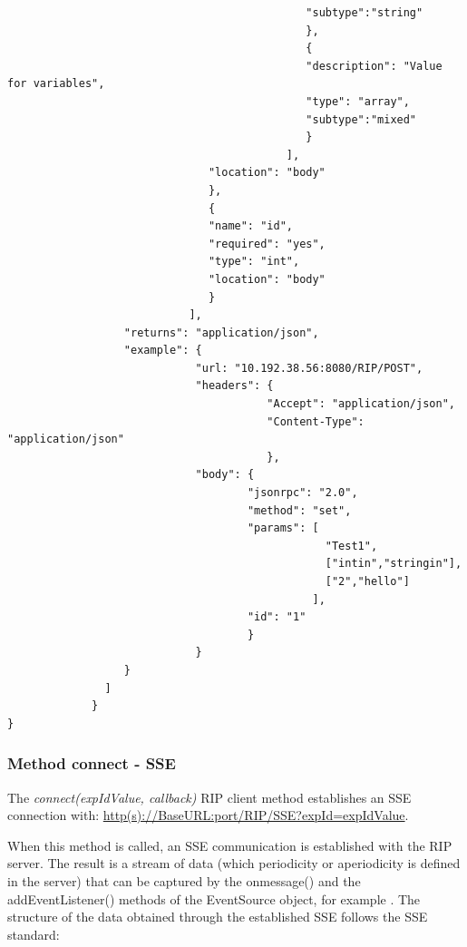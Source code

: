 \begin{lstlisting}
                                              "subtype":"string"
                                              },
                                              {
                                              "description": "Value for variables",
                                              "type": "array",
                                              "subtype":"mixed"
                                              }
                                           ],
                               "location": "body"
                               },
                               {
                               "name": "id",
                               "required": "yes",
                               "type": "int",
                               "location": "body"
                               }
                            ],
                  "returns": "application/json",
                  "example": {
                             "url: "10.192.38.56:8080/RIP/POST",
                             "headers": {
                                        "Accept": "application/json",
                                        "Content-Type": "application/json"
                                        },
                             "body": {
                                     "jsonrpc": "2.0",
                                     "method": "set",
                                     "params": [
                                                 "Test1",
                                                 ["intin","stringin"],
                                                 ["2","hello"]
                                               ],
                                     "id": "1"
                                     }
                             }
                  }
               ]
             }
}
\end{lstlisting}

\subsubsection{Method connect - SSE}
\label{sec:connect}
The \textit{connect(expIdValue, callback)} RIP client method establishes an SSE connection with: \url{http(s)://BaseURL:port/RIP/SSE?expId=expIdValue}.

When this method is called, an SSE communication is established with the RIP server. The result is a stream of data (which periodicity or aperiodicity is defined in the server) that can be captured by the onmessage() and the addEventListener() methods of the EventSource object, for example \cite{sse}. The structure of the data obtained through the established SSE follows the SSE standard:

